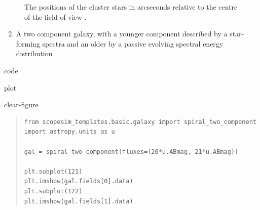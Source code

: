 \begin{figure}[H]
\noindent{}\label{fig-scopesim-templates-cluster}

\caption{The positions of the cluster stars in arcseconds relative to the centre of the field of view .}
\end{figure}

\begin{enumerate}
\setcounter{enumi}{1}
\item A two component galaxy, with a younger component described by a star-forming spectra and an older by a
passive evolving spectral energy distribution
\end{enumerate}

\label{scopesim-templates-galaxy}
\begin{DUclass}{code}
\begin{DUclass}{plot}
\begin{DUclass}{clear-figure}
\begin{quote}
\begin{alltt}
\begin{lstlisting}[frame=single]
from scopesim_templates.basic.galaxy import spiral_two_component
import astropy.units as u

gal = spiral_two_component(fluxes=(20*u.ABmag, 21*u.ABmag))

plt.subplot(121)
plt.imshow(gal.fields[0].data)
plt.subplot(122)
plt.imshow(gal.fields[1].data)
\end{lstlisting}
\end{alltt}
\end{quote}
\end{DUclass}
\end{DUclass}
\end{DUclass}

